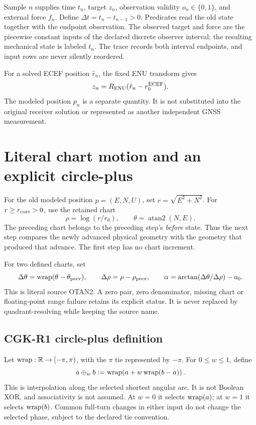 Sample $n$ supplies time $t_n$, target $z_n$, observation validity $o_n\in\{0,1\}$,
and external force $f_n$. Define $\Delta t=t_n-t_{n-1}>0$. Predicates read the
old state together with the endpoint observation. The observed target and force
are the piecewise constant inputs of the declared discrete observer interval;
the resulting mechanical state is labeled $t_n$. The trace records both interval
endpoints, and input rows are never silently reordered.

For a solved ECEF position $\hat r_n$, the fixed ENU transform gives
\begin{equation}
z_n=R_{\rm ENU}(\hat r_n-r_0^{\rm ECEF}).
\end{equation}
The modeled position $p_n$ is a separate quantity. It is not substituted into the
original receiver solution or represented as another independent GNSS measurement.
\clearpage

\section{Literal chart motion and an explicit circle-plus}
For the old modeled position $p=(E,N,U)$, set $r=\sqrt{E^2+N^2}$. For
$r\ge r_{\rm core}>0$, use the retained chart
\begin{equation}
\rho=\log(r/r_0),\qquad \theta=\operatorname{atan2}(N,E).
\end{equation}
The preceding chart belongs to the preceding step's \emph{before} state. Thus
the next step compares the newly advanced physical geometry with the geometry
that produced that advance. The first step has no chart increment.

For two defined charts, set
\begin{equation}
\Delta\theta=\operatorname{wrap}(\theta-\theta_{\rm prev}),\qquad
\Delta\rho=\rho-\rho_{\rm prev},\qquad
\alpha=\arctan(\Delta\theta/\Delta\rho)-a_0.
\end{equation}
This is literal source OTAN2. A zero pair, zero denominator, missing chart or
floating-point range failure retains its explicit status. It is never replaced
by quadrant-resolving  while keeping the source name.

\subsection{CGK-R1 circle-plus definition}
Let $\operatorname{wrap}:\mathbb R\to[-\pi,\pi)$, with the $\pi$ tie represented by $-\pi$. For
$0\le w\le1$, define
\begin{equation}
a\mathbin{\oplus_w}b:=\operatorname{wrap}\!\left(a+w\operatorname{wrap}(b-a)\right).
\label{eq:circleplus}
\end{equation}
This is interpolation along the selected shortest angular arc. It is not Boolean
XOR, and associativity is not assumed. At $w=0$ it selects $\operatorname{wrap}(a)$; at $w=1$
it selects $\operatorname{wrap}(b)$. Common full-turn changes in either input do not change
the selected phase, subject to the declared tie convention.

